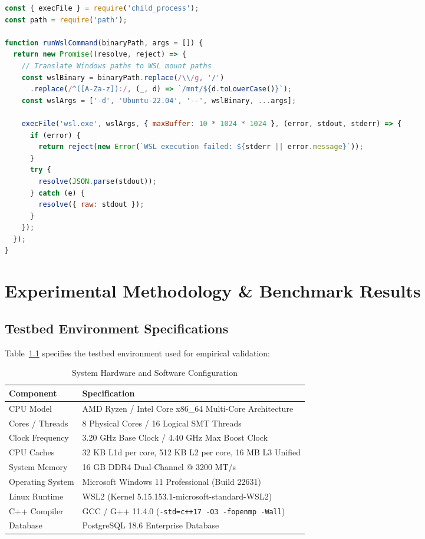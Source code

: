 \documentclass[12pt,a4paper,oneside]{report}
\begin{document}
\begin{lstlisting}[language=JavaScript, caption={Cross-Subsystem WSL Bridge (\texttt{backend/src/services/cppRunner.js})}]
const { execFile } = require('child_process');
const path = require('path');

function runWslCommand(binaryPath, args = []) {
  return new Promise((resolve, reject) => {
    // Translate Windows paths to WSL mount paths
    const wslBinary = binaryPath.replace(/\\/g, '/')
      .replace(/^([A-Za-z]):/, (_, d) => `/mnt/${d.toLowerCase()}`);
    const wslArgs = ['-d', 'Ubuntu-22.04', '--', wslBinary, ...args];

    execFile('wsl.exe', wslArgs, { maxBuffer: 10 * 1024 * 1024 }, (error, stdout, stderr) => {
      if (error) {
        return reject(new Error(`WSL execution failed: ${stderr || error.message}`));
      }
      try {
        resolve(JSON.parse(stdout));
      } catch (e) {
        resolve({ raw: stdout });
      }
    });
  });
}
\end{lstlisting}

\chapter{Experimental Methodology \& Benchmark Results}

\section{Testbed Environment Specifications}
Table~\ref{tab:testbed} specifies the testbed environment used for empirical validation:

\begin{table}[h!]
\centering
\caption{System Hardware and Software Configuration}
\label{tab:testbed}
\begin{tabularx}{\textwidth}{lX}
\toprule
\textbf{Component} & \textbf{Specification} \\
\midrule
CPU Model & AMD Ryzen / Intel Core x86\_64 Multi-Core Architecture \\
Cores / Threads & 8 Physical Cores / 16 Logical SMT Threads \\
Clock Frequency & 3.20 GHz Base Clock / 4.40 GHz Max Boost Clock \\
CPU Caches & 32 KB L1d per core, 512 KB L2 per core, 16 MB L3 Unified \\
System Memory & 16 GB DDR4 Dual-Channel @ 3200 MT/s \\
Operating System & Microsoft Windows 11 Professional (Build 22631) \\
Linux Runtime & WSL2 (Kernel 5.15.153.1-microsoft-standard-WSL2) \\
C++ Compiler & GCC / G++ 11.4.0 (\texttt{-std=c++17 -O3 -fopenmp -Wall}) \\
Database & PostgreSQL 18.6 Enterprise Database \\
\bottomrule
\end{tabularx}
\end{table}
\end{document}

